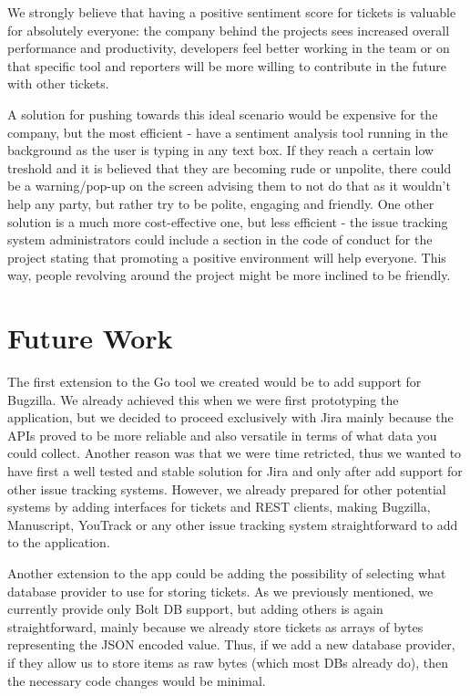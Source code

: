 \documentclass{mpaper}
\begin{document}
We strongly believe that having a positive sentiment score for tickets is valuable for absolutely everyone: the company
behind the projects sees increased overall performance and productivity, developers feel better working in the team or
on that specific tool and reporters will be more willing to contribute in the future with other tickets.

A solution for pushing towards this ideal scenario would be expensive for the company, but the most efficient - have a 
sentiment analysis tool running in the background as the user is typing in any text box. If they reach a certain low 
treshold and it is believed that they are becoming rude or unpolite, there could be a warning/pop-up on the screen advising 
them to not do that as it wouldn't help any party, but rather try to be polite, engaging and friendly. One other solution
is a much more cost-effective one, but less efficient - the issue tracking system administrators could include a section 
in the code of conduct for the project stating that promoting a positive environment will help everyone. This way, people 
revolving around the project might be more inclined to be friendly.

\section{Future Work}\label{future_work}

The first extension to the Go tool we created would be to add support for Bugzilla. We already achieved this 
when we were first prototyping the application, but we decided to proceed exclusively with Jira mainly because 
the APIs proved to be more reliable and also versatile in terms of what data you could collect. Another 
reason was that we were time retricted, thus we wanted to have first a well tested and stable solution for Jira and 
only after add support for other issue tracking systems. However, we already prepared for other potential systems by 
adding interfaces for tickets and REST clients, making Bugzilla, Manuscript, YouTrack or any 
other issue tracking system straightforward to add to the application.

Another extension to the app could be adding the possibility of selecting what database provider to use 
for storing tickets. As we previously mentioned, we currently provide only Bolt DB support, but adding others is 
again straightforward, mainly because we already store tickets as arrays of bytes representing the JSON encoded 
value. Thus, if we add a new database provider, if they allow us to store items as raw bytes (which most DBs already 
do), then the necessary code changes would be minimal.
\end{document}
